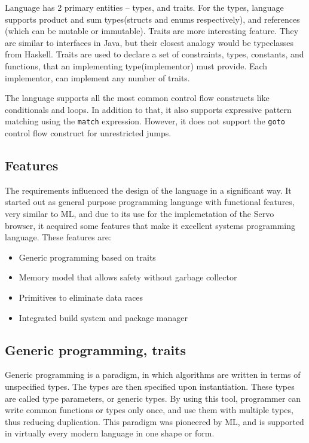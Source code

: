 Language has 2 primary entities -- types, and traits.
For the types, language supports product and sum types(structs and enums respectively), and references (which can be mutable or immutable).
Traits are more interesting feature. They are similar to interfaces in Java, but their closest analogy would be typeclasses from Haskell.
Traits are used to declare a set of constraints, types, constants, and functions, that an implementing type(implementor) must provide.
Each implementor, can implement any number of traits.

The language supports all the most common control flow constructs like conditionals and loops. In addition to that, it
also supports expressive pattern matching using the \verb|match| expression. However, it does not support the
\verb|goto| control flow construct for unrestricted jumps.

\subsection{Features}
The requirements influenced the design of the language in a significant way. It started out as general purpose programming
language with functional features, very similar to ML, and due to its use for the implemetation of the Servo browser, it acquired some features that make it excellent
systems programming language. These features are:

\begin{itemize}
    \item Generic programming based on traits
    \item Memory model that allows safety without garbage collector
    \item Primitives to eliminate data races
    \item Integrated build system and package manager
\end{itemize}

\subsection{Generic programming, traits}
Generic programming is a paradigm, in which algorithms are written in terms of unspecified types.
The types are then specified upon instantiation. These types are called type parameters, or generic types.
By using this tool, programmer can write common functions or types only once, and use them with multiple
types, thus reducing duplication. This paradigm was pioneered by ML, and is supported in virtually every
modern language in one shape or form.

